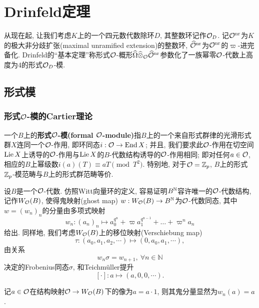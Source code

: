 \section{Drinfeld定理}
从现在起, 让我们考虑$K$上的一个四元数代数除环$D$, 其整数环记作$\mathcal{O}_D$.
记$\mathcal{O}^{\mathrm{nr}}$为$K$的极大非分歧扩张(maximal unramified extension)的整数环, $\widehat{\mathcal{O}}^{\mathrm{nr}}$为$\mathcal{O}^{\mathrm{nr}}$的$\varpi$-进完备化.
Drinfeld的``基本定理''称形式$\mathcal{O}$-概形$\widehat{\Omega}\widehat{\otimes}_{\mathcal{O}}\widehat{\mathcal{O}}^{\mathrm{nr}}$参数化了一族幂零$\mathcal{O}$-代数上高度为$4$的形式$\mathcal{O}_D$-模.

\subsection{形式模}
\subsubsection{形式$\mathcal{O}$-模的Cartier理论}
\begin{definition}
    一个$B$上的\textbf{形式$\mathcal{O}$-模(formal $\mathcal{O}$-module)}指$B$上的一个来自形式群律的光滑形式群$X$连同一个$\mathcal{O}$-作用,
    即环同态$i : \mathcal{O}\to \operatorname{End} X$;
    并且, 我们要求此$\mathcal{O}$-作用在切空间$\operatorname{Lie} X$上诱导的$\mathcal{O}$-作用与$\operatorname{Lie} X$的$B$-代数结构诱导的$\mathcal{O}$-作用相同;
    即对任何$a\in \mathcal{O}$, 相应的$B$上幂级数$i(a)(T)\equiv aT\pmod{T^2}$.
    特别地, 对于$\mathcal{O} = \mathbb{Z}_p$, $B$上的形式$\mathbb{Z}_p$-模范畴与$B$上的形式群范畴等价.
\end{definition}



设$B$是一个$\mathcal{O}$-代数. 仿照Witt向量环的定义, 容易证明$B^{\mathbb{N}}$容许唯一的$\mathcal{O}$-代数结构, 记作$W_{\mathcal{O}}(B)$,
使得鬼映射(ghost map) $w : W_{\mathcal{O}}(B)\to B^\mathbb{N}$为$\mathcal{O}$-代数同态, 其中$w = (w_n)_n$的分量由多项式映射\[w_n : (a_n)_n\mapsto a_0^{q^n} + \varpi a_1^{q^{n-1}} + \dots + \varpi^{n}a_n\]
给出.
同样地, 我们考虑$W_{\mathcal{O}}(B)$上的移位映射(Verschiebung map) \[\tau : (a_0, a_1, a_2,\cdots)\mapsto (0, a_0, a_1, \cdots),\]
由关系\[w_n\sigma = w_{n+1},\ \forall n\in\mathbb{N}\]决定的Frobenius同态$\sigma$, 和Teichm\"uller提升\[[\cdot] : a \mapsto (a, 0, 0, \cdots).\]

记$a\in \mathcal{O}$在结构映射$\mathcal{O}\to W_{\mathcal{O}}(B)$下的像为$a = a\cdot 1$, 则其鬼分量显然为$w_n(a) = a$.


